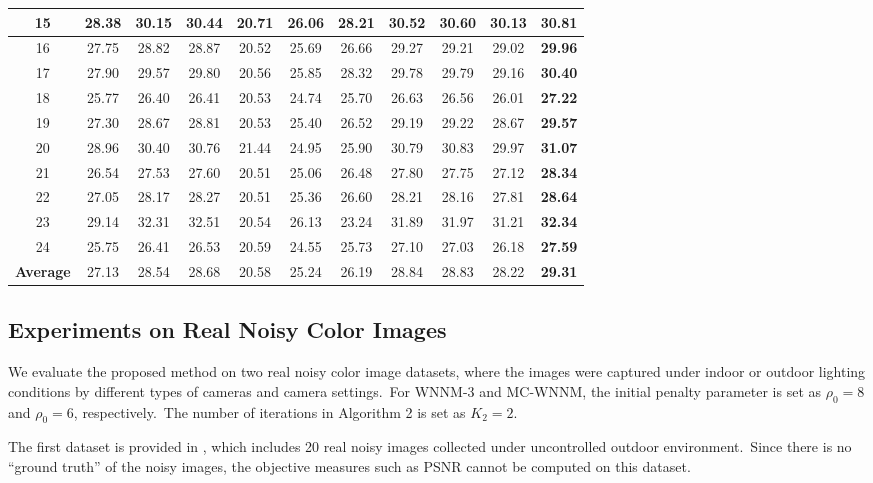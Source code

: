 \begin{table}
\begin{center}
\begin{tabular}{|c||c|c|c|c|c|c|c|c|c|c|}
\\
\hline
15& 28.38 & 30.15 & 30.44 & 20.71 & 26.06 & 28.21 & 30.52 & 30.60 & 30.13 & \textbf{30.81}
\\
\hline
16& 27.75 & 28.82 & 28.87 & 20.52 & 25.69 & 26.66 & 29.27 & 29.21 & 29.02 & \textbf{29.96}
\\
\hline
17& 27.90 & 29.57 & 29.80 & 20.56 & 25.85 & 28.32 & 29.78 & 29.79 & 29.16 & \textbf{30.40}
\\
\hline
18& 25.77 & 26.40 & 26.41 & 20.53 & 24.74 & 25.70 & 26.63 & 26.56 & 26.01 & \textbf{27.22}
\\
\hline
19& 27.30 & 28.67 & 28.81 & 20.53 & 25.40 & 26.52 & 29.19 & 29.22 & 28.67 & \textbf{29.57}
\\
\hline
20& 28.96 & 30.40 & 30.76 & 21.44 & 24.95 & 25.90 & 30.79 & 30.83 & 29.97 & \textbf{31.07}
\\
\hline
21& 26.54 & 27.53 & 27.60 & 20.51 & 25.06 & 26.48 & 27.80 & 27.75 & 27.12 & \textbf{28.34}
\\
\hline
22& 27.05 & 28.17 & 28.27 & 20.51 & 25.36 & 26.60 & 28.21 & 28.16 & 27.81 & \textbf{28.64}
\\
\hline
23& 29.14 & 32.31 & 32.51 & 20.54 & 26.13 & 23.24 & 31.89 & 31.97 & 31.21 & \textbf{32.34}
\\
\hline
24& 25.75 & 26.41 & 26.53 & 20.59 & 24.55 & 25.73 & 27.10 & 27.03 & 26.18 & \textbf{27.59}
\\
\hline
\textbf{Average} 
& 27.13 & 28.54 & 28.68 & 20.58 & 25.24 & 26.19 & 28.84 & 28.83 & 28.22 & \textbf{29.31}
\\
\hline
\end{tabular}
\end{center}
\end{table}

\subsection{Experiments on Real Noisy Color Images}

We evaluate the proposed method on two real noisy color image datasets, where the images were captured under indoor or outdoor lighting conditions by different types of cameras and camera settings.\ For WNNM-3 and MC-WNNM, the initial penalty parameter is set as $\rho_{0}=8$ and $\rho_{0}=6$, respectively.\ The number of iterations in Algorithm 2 is set as $K_{2}=2$.

The first dataset is provided in \cite{ncwebsite}, which includes 20 real noisy images collected under uncontrolled outdoor environment.\ Since there is no ``ground truth'' of the noisy images, the objective measures such as PSNR cannot be computed on this dataset.

